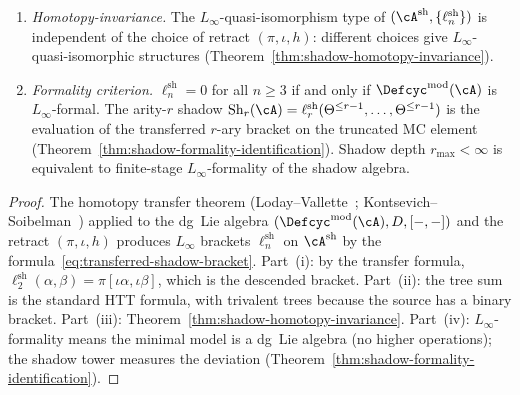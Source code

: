 \begin{proposition}
\begin{enumerate}[label=\textup{(\roman*)}]
  homotopy transfer: each tree $T$ is a Feynman graph, the homotopy
  $h$ is the propagator, and the binary brackets are the vertices.
\item \emph{Homotopy-invariance.}
  The $L_\infty$-quasi-isomorphism type of
  $(\cA^{\mathrm{sh}}, \{\ell_n^{\mathrm{sh}}\})$ is independent
  of the choice of retract $(\pi, \iota, h)$: different choices
  give $L_\infty$-quasi-isomorphic structures
  \textup{(}Theorem~\textup{\ref{thm:shadow-homotopy-invariance})}.
\item \emph{Formality criterion.}
  $\ell_n^{\mathrm{sh}} = 0$ for all $n \geq 3$ if and only if
  $\Defcyc^{\mathrm{mod}}(\cA)$ is $L_\infty$-formal.
  The arity-$r$ shadow
  $\operatorname{Sh}_r(\cA) = \ell_r^{\mathrm{sh}}
  (\Theta^{\leq r-1}, \ldots, \Theta^{\leq r-1})$
  is the evaluation of the transferred $r$-ary bracket on the
  truncated MC element
  \textup{(}Theorem~\textup{\ref{thm:shadow-formality-identification})}.
  Shadow depth $r_{\max} < \infty$ is equivalent to
  finite-stage $L_\infty$-formality of the shadow algebra.
\end{enumerate}
\end{proposition}

\begin{proof}
The homotopy transfer theorem
(Loday--Vallette~\cite[Theorem~10.3.1]{LV12};
Kontsevich--Soibelman~\cite[Section~6.4]{KontsevichSoibelman})
applied to the dg~Lie algebra
$(\Defcyc^{\mathrm{mod}}(\cA), D, [-,-])$ and the retract
$(\pi, \iota, h)$ produces $L_\infty$ brackets
$\ell_n^{\mathrm{sh}}$ on $\cA^{\mathrm{sh}}$ by
the formula~\eqref{eq:transferred-shadow-bracket}.
Part~(i): by the transfer formula,
$\ell_2^{\mathrm{sh}}(\alpha, \beta)
= \pi[\iota\alpha, \iota\beta]$, which is the descended bracket.
Part~(ii): the tree sum is the standard HTT formula, with
trivalent trees because the source has a binary bracket.
Part~(iii): Theorem~\ref{thm:shadow-homotopy-invariance}.
Part~(iv): $L_\infty$-formality means the minimal model is a
dg~Lie algebra (no higher operations); the shadow tower
measures the deviation
(Theorem~\ref{thm:shadow-formality-identification}).
\end{proof}

